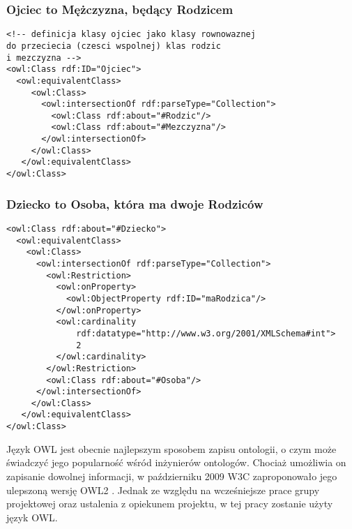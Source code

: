 \subsubsection*{Ojciec to Mężczyzna, będący Rodzicem}
\begin{verbatim}
<!-- definicja klasy ojciec jako klasy rownowaznej
do przeciecia (czesci wspolnej) klas rodzic
i mezczyzna -->
<owl:Class rdf:ID="Ojciec">
  <owl:equivalentClass>
     <owl:Class>
       <owl:intersectionOf rdf:parseType="Collection">
         <owl:Class rdf:about="#Rodzic"/>
         <owl:Class rdf:about="#Mezczyzna"/>
       </owl:intersectionOf>
     </owl:Class>
   </owl:equivalentClass>
</owl:Class>
\end{verbatim}



\subsubsection*{Dziecko to Osoba, która ma dwoje Rodziców}
\begin{verbatim}
<owl:Class rdf:about="#Dziecko">
  <owl:equivalentClass>
    <owl:Class>
      <owl:intersectionOf rdf:parseType="Collection">
        <owl:Restriction>
          <owl:onProperty>
            <owl:ObjectProperty rdf:ID="maRodzica"/>
          </owl:onProperty>
          <owl:cardinality
              rdf:datatype="http://www.w3.org/2001/XMLSchema#int">
              2
          </owl:cardinality>
        </owl:Restriction>
        <owl:Class rdf:about="#Osoba"/>
      </owl:intersectionOf>
     </owl:Class>
   </owl:equivalentClass>
</owl:Class>
\end{verbatim}
  
Język OWL jest obecnie najlepszym sposobem zapisu ontologii, o czym może świadczyć jego popularność wśród inżynierów ontologów. Chociaż umożliwia on zapisanie dowolnej informacji, 
w październiku 2009 W3C zaproponowało jego ulepszoną wersję OWL2 \cite{OWL2}. Jednak ze względu na wcześniejsze prace grupy projektowej oraz ustalenia z opiekunem projektu, 
w tej pracy zostanie użyty język OWL. 
